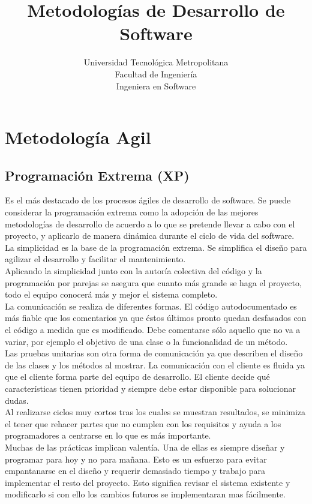 \documentclass[a4paper,11pt]{article}
\title{Metodologías de Desarrollo de Software}
\author{Universidad Tecnológica Metropolitana\\ Facultad de Ingeniería\\
Ingeniera en Software}
\begin{document}
\maketitle

\newpage

\section{Metodología Agil}
\subsection{Programación Extrema (XP)}
Es el más destacado de los procesos ágiles de desarrollo de software. Se puede considerar la programación extrema como la adopción de las mejores metodologías de desarrollo de acuerdo a lo que se pretende llevar a cabo con el proyecto, y aplicarlo de manera dinámica durante el ciclo de vida del software.\\
La simplicidad es la base de la programación extrema. Se simplifica el diseño para agilizar el desarrollo y facilitar el mantenimiento. \\
Aplicando la simplicidad junto con la autoría colectiva del código y la programación por parejas se asegura que cuanto más grande se haga el proyecto, todo el equipo conocerá más y mejor el sistema completo.\\
La comunicación se realiza de diferentes formas. El código autodocumentado es más fiable que los comentarios ya que éstos últimos pronto quedan desfasados con el código a medida que es modificado. Debe comentarse sólo aquello que no va a variar, por ejemplo el objetivo de una clase o la funcionalidad de un método.\\
Las pruebas unitarias son otra forma de comunicación ya que describen el diseño de las clases y los métodos al mostrar. La comunicación con el cliente es fluida ya que el cliente forma parte del equipo de desarrollo. El cliente decide qué características tienen prioridad y siempre debe estar disponible para solucionar dudas.\\
Al realizarse ciclos muy cortos tras los cuales se muestran resultados, se minimiza el tener que rehacer partes que no cumplen con los requisitos y ayuda a los programadores a centrarse en lo que es más importante.\\
Muchas de las prácticas implican valentía. Una de ellas es siempre diseñar y programar para hoy y no para mañana. Esto es un esfuerzo para evitar empantanarse en el diseño y requerir demasiado tiempo y trabajo para implementar el resto del proyecto. Esto significa revisar el sistema existente y modificarlo si con ello los cambios futuros se implementaran mas fácilmente.\\
\end{document}
